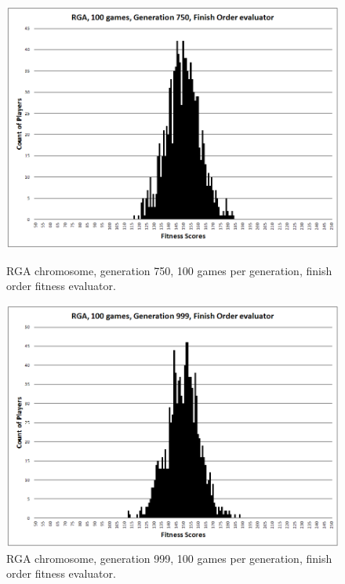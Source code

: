 \begin{figure}
\begin{minipage}[t]{0.47\linewidth}
\centering
\includegraphics[width=1.0\linewidth]{Figures/RGA_1024_G750_N100_FO.png}
\caption[RGA Fitness Distribution, 750th Generation]{RGA chromosome, generation
750, 100 games per generation, finish order fitness evaluator.} 
\label{figure-RGA-750th_gen_fitness}
\end{minipage}%
\hspace{0.06\linewidth}%
\begin{minipage}[t]{0.47\linewidth}
\centering
\includegraphics[width=1.0\linewidth]{Figures/RGA_1024_G999_N100_FO.png}
\caption[RGA Fitness Distribution, 999th Generation]{RGA chromosome, generation
999, 100 games per generation, finish order fitness evaluator.} 
\label{figure-RGA-999th_gen_fitness}
\end{minipage}
\end{figure}

